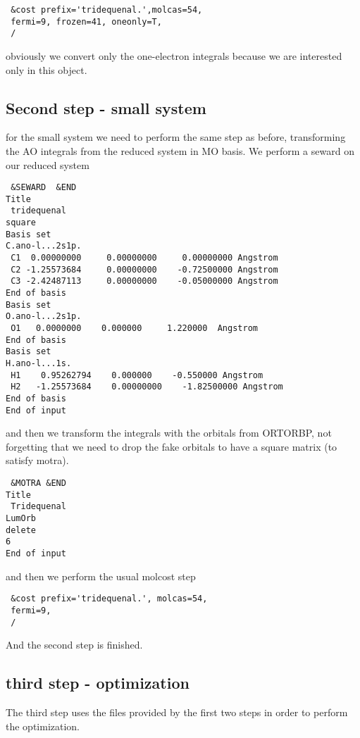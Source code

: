 \documentclass[11pt,a4paper]{article}
\begin{document}
\begin{verbatim}
 &cost prefix='tridequenal.',molcas=54,
 fermi=9, frozen=41, oneonly=T,
 /
\end{verbatim}

obviously we convert only the one-electron integrals because we are
interested only in this object.


\subsection{Second step - small system}

for the small system we need to perform the same step as before,
transforming the AO integrals from the reduced system in MO basis.
We perform a seward on our reduced system

\begin{verbatim}
 &SEWARD  &END
Title
 tridequenal
square
Basis set
C.ano-l...2s1p.
 C1  0.00000000     0.00000000     0.00000000 Angstrom
 C2 -1.25573684     0.00000000    -0.72500000 Angstrom
 C3 -2.42487113     0.00000000    -0.05000000 Angstrom
End of basis
Basis set
O.ano-l...2s1p.
 O1   0.0000000    0.000000     1.220000  Angstrom
End of basis
Basis set
H.ano-l...1s.
 H1    0.95262794    0.000000    -0.550000 Angstrom
 H2   -1.25573684    0.00000000    -1.82500000 Angstrom
End of basis
End of input
\end{verbatim}

and then we transform the integrals with the orbitals from ORTORBP, not
forgetting that we need to drop the fake orbitals to have a square matrix
(to satisfy motra).

\begin{verbatim}
 &MOTRA &END
Title
 Tridequenal
LumOrb
delete
6
End of input
\end{verbatim}

and then we perform the usual molcost step

\begin{verbatim}
 &cost prefix='tridequenal.', molcas=54,
 fermi=9,
 /
\end{verbatim}

And the second step is finished.


\subsection{third step - optimization}

The third step uses the files provided by the first two steps in order to
perform the optimization.
\end{document}
